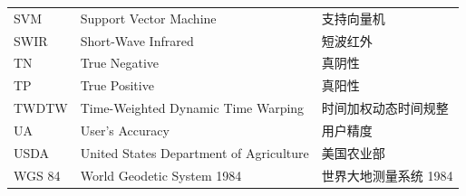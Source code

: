 \begin{center}
\begin{longtable}{@{}m{3cm}m{7.3cm}m{4.8cm}@{}}
        SVM&Support Vector Machine&支持向量机\\
        SWIR&Short-Wave Infrared&短波红外\\
        TN&True Negative&真阴性\\
        TP&True Positive&真阳性\\
        TWDTW&Time-Weighted Dynamic Time Warping&时间加权动态时间规整\\
        UA&User's Accuracy&用户精度\\
        USDA&United States Department of Agriculture&美国农业部\\
        WGS 84&World Geodetic System 1984&世界大地测量系统 1984\\
	\end{longtable}
\end{center}
